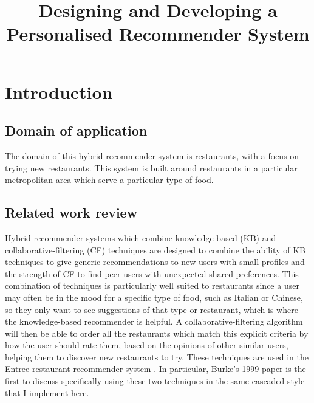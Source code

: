 \documentclass[conference]{IEEEtran}
\begin{document}
\title{Designing and Developing a Personalised Recommender System}

\author{
}

\maketitle


\section{Introduction}

\subsection{Domain of application}
The domain of this hybrid recommender system is restaurants, with a focus on trying new restaurants. 
This system is built around restaurants in a particular metropolitan area which serve a particular 
type of food. 

\subsection{Related work review}
Hybrid recommender systems which combine knowledge-based (KB) and collaborative-filtering (CF) techniques 
are designed to combine the ability of KB techniques to give generic recommendations to new users with 
small profiles and the strength of CF to find peer users with unexpected shared preferences. 
This combination of techniques is particularly well suited to restaurants since a user may often be in the 
mood for a specific type of food, such as Italian or Chinese, so they only want to see suggestions of that 
type or restaurant, which is where the knowledge-based recommender is helpful. 
A collaborative-filtering algorithm will then be able to order all the restaurants which match this 
explicit criteria by how the user should rate them, based on the opinions of other similar users, 
helping them to discover new restaurants to try. 
These techniques are used in the Entree restaurant recommender system \cite{burke1999integrating,burke2000knowledge,burke2002hybrid,burke2007hybrid}. 
In particular, Burke's 1999 paper \cite{burke1999integrating} is the first to discuss specifically using these 
two techniques in the same cascaded style that I implement here. 
\end{document}
